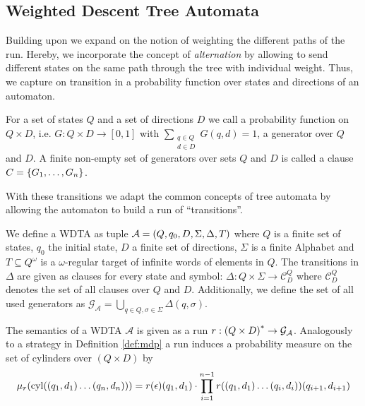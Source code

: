 \subsection{Weighted Descent Tree Automata}
Building upon \cite{RandAutoInfTrees} we expand on the notion of weighting
the different paths of the run. Hereby, we incorporate the concept of
\emph{alternation} by allowing to send different states on the same path
through the tree with individual weight. Thus, we capture on transition in a
probability function over states and directions of an automaton.
\begin{definition}[Generator]
  For a set of states $Q$ and a set of directions $D$ we call a probability
  function on $Q\times D$, i.e. $G: Q\times D\rightarrow [0,1]$ with
  $\sum\limits_{\substack{q\in Q\\ d\in D}}G(q,d) = 1$, a generator over $Q$
  and $D$. A finite non-empty set of generators over sets $Q$ and $D$ is called
  a clause $C = \left\{G_{1},\dots,G_{n}\right\}$.
\end{definition}
With these transitions we adapt the common concepts of tree automata by
allowing the automaton to build a run of \enquote{transitions}.
\begin{definition}
  We define a \acl{WDTA} as tuple
  $\mathcal{A} = \left(Q, q_{0}, D, \Sigma, \Delta, T\right)$ where $Q$ is a finite
  set of states, $q_{0}$ the initial state, $D$ a finite set of directions,
  $\Sigma$ is a finite Alphabet and $T\subseteq Q^{\omega}$ is a
  $\omega$-regular target of infinite words of elements in $Q$. The transitions
  in $\Delta$ are given as clauses for every state and symbol:
  $\Delta:Q\times\Sigma\rightarrow\mathcal{C}^{Q}_{D}$
  where $\mathcal{C}^{Q}_{D}$ denotes the set of all clauses over $Q$ and $D$.
  Additionally, we define the set of all used generators as
  $\mathcal{G}_{\mathcal{A}} = \bigcup\limits_{q\in Q,\sigma\in\Sigma}
    \Delta(q,\sigma)$.
\end{definition}
The semantics of a \ac{WDTA} $\mathcal{A}$ is given as a run
$r:\left(Q\times D\right)^{*}\rightarrow \mathcal{G}_{\mathcal{A}}$. Analogously to
a strategy in Definition \ref{def:mdp} a run induces a probability measure on
the set of cylinders over $(Q\times D)$ by
\begin{equation}
  \mu_{r}(\operatorname{cyl}(\left(q_{1},d_{1}\right)\dots\left(q_{n},d_{n}\right)))
    = r(\epsilon)(q_{1},d_{1})\cdot\prod\limits_{i = 1}^{n - 1}
    r(\left(q_{1},d_{1}\right)\dots\left(q_{i},d_{i}\right))(q_{i+1},d_{i+1})
\end{equation}
